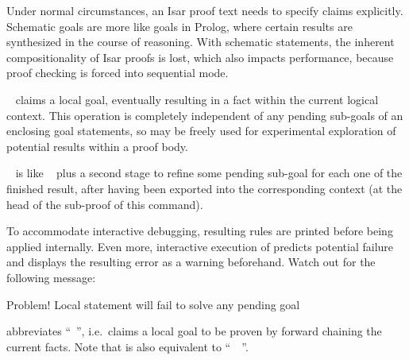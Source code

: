 \begin{isabellebody}
\begin{isamarkuptext}
\begin{description}
  Under normal circumstances, an Isar proof text needs to specify
  claims explicitly.  Schematic goals are more like goals in Prolog,
  where certain results are synthesized in the course of reasoning.
  With schematic statements, the inherent compositionality of Isar
  proofs is lost, which also impacts performance, because proof
  checking is forced into sequential mode.
  
  \item \hyperlink{command.have}{\mbox{}}~ claims a local goal,
  eventually resulting in a fact within the current logical context.
  This operation is completely independent of any pending sub-goals of
  an enclosing goal statements, so \hyperlink{command.have}{\mbox{}} may be freely
  used for experimental exploration of potential results within a
  proof body.
  
  \item \hyperlink{command.show}{\mbox{}}~ is like \hyperlink{command.have}{\mbox{}}~ plus a second stage to refine some pending
  sub-goal for each one of the finished result, after having been
  exported into the corresponding context (at the head of the
  sub-proof of this \hyperlink{command.show}{\mbox{}} command).
  
  To accommodate interactive debugging, resulting rules are printed
  before being applied internally.  Even more, interactive execution
  of \hyperlink{command.show}{\mbox{}} predicts potential failure and displays the
  resulting error as a warning beforehand.  Watch out for the
  following message:

  \begin{ttbox}
  Problem! Local statement will fail to solve any pending goal
  \end{ttbox}
  
  \item \hyperlink{command.hence}{\mbox{}} abbreviates ``\hyperlink{command.then}{\mbox{}}~\hyperlink{command.have}{\mbox{}}'', i.e.\ claims a local goal to be proven by forward
  chaining the current facts.  Note that \hyperlink{command.hence}{\mbox{}} is also
  equivalent to ``\hyperlink{command.from}{\mbox{}}~~\hyperlink{command.have}{\mbox{}}''.
  

\end{description}
\end{isamarkuptext}
\end{isabellebody}
